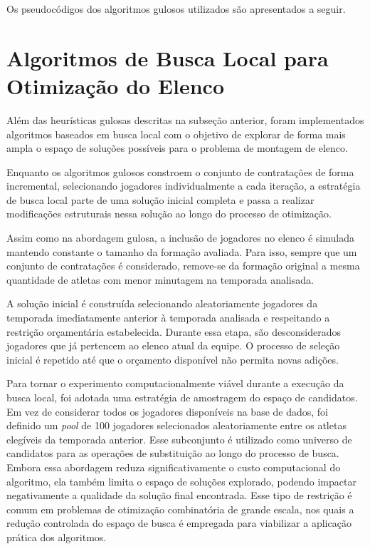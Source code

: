 Os pseudocódigos dos algoritmos gulosos utilizados são apresentados a seguir.



\FloatBarrier

\section{Algoritmos de Busca Local para Otimização do Elenco}

Além das heurísticas gulosas descritas na subseção anterior, foram implementados algoritmos baseados em busca local com o objetivo de explorar de 
forma mais ampla o espaço de soluções possíveis para o problema de montagem de elenco.

Enquanto os algoritmos gulosos constroem o conjunto de contratações de forma incremental, selecionando jogadores individualmente a cada iteração, 
a estratégia de busca local parte de uma solução inicial completa e passa a realizar modificações estruturais nessa solução ao longo do processo de otimização.

Assim como na abordagem gulosa, a inclusão de jogadores no elenco é simulada mantendo constante o tamanho da formação avaliada. Para isso, 
sempre que um conjunto de contratações é considerado, remove-se da formação original a mesma quantidade de atletas com menor minutagem na temporada analisada.

A solução inicial é construída selecionando aleatoriamente jogadores da temporada imediatamente anterior à temporada analisada e respeitando a restrição 
orçamentária estabelecida. Durante essa etapa, são desconsiderados jogadores que já pertencem ao elenco atual da equipe. O processo de seleção inicial 
é repetido até que o orçamento disponível não permita novas adições.

Para tornar o experimento computacionalmente viável durante a execução da busca local, foi adotada uma estratégia de amostragem do espaço de candidatos. 
Em vez de considerar todos os jogadores disponíveis na base de dados, foi definido um \textit{pool} de 100 jogadores selecionados aleatoriamente entre 
os atletas elegíveis da temporada anterior. Esse subconjunto é utilizado como universo de candidatos para as operações de substituição ao longo do processo de 
busca. Embora essa abordagem reduza significativamente o custo computacional do algoritmo, ela também limita o espaço de soluções explorado, podendo 
impactar negativamente a qualidade da solução final encontrada. Esse tipo de restrição é comum em problemas de otimização combinatória de grande escala, 
nos quais a redução controlada do espaço de busca é empregada para viabilizar a aplicação prática dos algoritmos.

